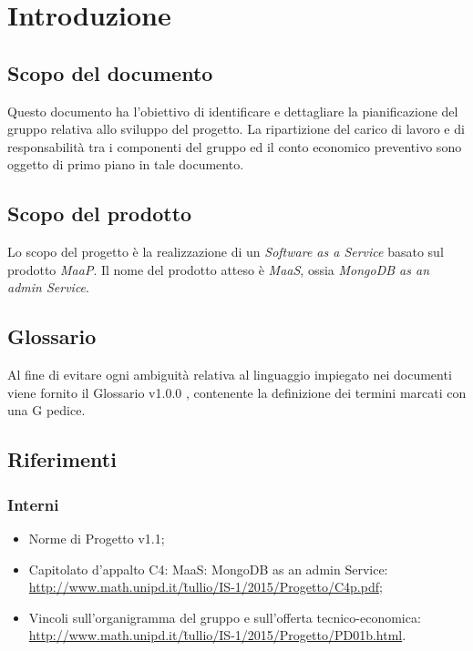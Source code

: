 \section{Introduzione}
\subsection{Scopo del documento}
Questo documento ha l’obiettivo di identificare e dettagliare la pianificazione del gruppo
relativa allo sviluppo del progetto. La ripartizione del carico di lavoro e di responsabilit\`a tra i
componenti del gruppo ed il conto economico preventivo sono oggetto di primo piano in tale documento.

\subsection{Scopo del prodotto}
Lo scopo del progetto \`e la realizzazione di un \textit{Software as a Service} basato sul prodotto \textit{MaaP}. Il nome del prodotto atteso \`e \textit{MaaS}, ossia \textit{MongoDB as an admin Service}.

\subsection{Glossario}
Al fine di evitare ogni ambiguit\`a relativa al linguaggio impiegato nei documenti viene fornito il Glossario
v1.0.0 , contenente la definizione dei termini marcati con una G pedice.

\subsection{Riferimenti}
\subsubsection{Interni}
\begin{itemize}
\item Norme di Progetto v1.1;
\item Capitolato d'appalto C4: MaaS: MongoDB as an admin Service: \\ \href{http://www.math.unipd.it/~tullio/IS-1/2015/Progetto/C4p.pdf}{http://www.math.unipd.it/\~tullio/IS-1/2015/Progetto/C4p.pdf}; 
\item Vincoli sull’organigramma del gruppo e sull’offerta tecnico-economica: \\
\href{http://www.math.unipd.it/~tullio/IS-1/2015/Progetto/PD01b.html}{http://www.math.unipd.it/\~tullio/IS-1/2015/Progetto/PD01b.html}.
\end{itemize}
